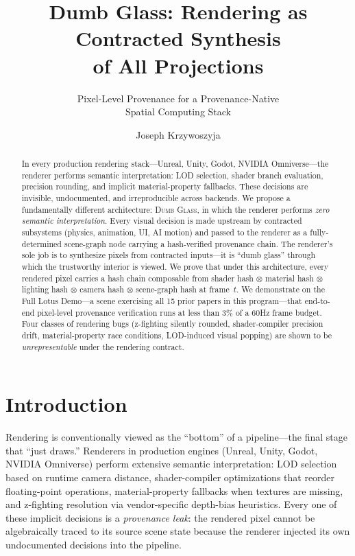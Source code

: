 \documentclass[sigconf,nonacm]{acmart}
\title{Dumb Glass: Rendering as Contracted Synthesis\\
of All Projections}
\subtitle{Pixel-Level Provenance for a Provenance-Native\\
Spatial Computing Stack}
\author{Joseph Krzywoszyja}
\affiliation{%
  \institution{Infinitus Systems}
  \country{USA}
}
\newcommand{\dumbglass}{\textsc{Dumb Glass}}
\newcommand{\tropmult}{\otimes}
\begin{document}
\begin{abstract}
In every production rendering stack---Unreal, Unity, Godot,
NVIDIA Omniverse---the renderer performs semantic interpretation:
LOD selection, shader branch evaluation, precision rounding, and
implicit material-property fallbacks. These decisions are invisible,
undocumented, and irreproducible across backends. We propose a
fundamentally different architecture: \dumbglass{}, in which the
renderer performs \emph{zero semantic interpretation}. Every visual
decision is made upstream by contracted subsystems (physics,
animation, UI, AI motion) and passed to the renderer as a
fully-determined scene-graph node carrying a hash-verified
provenance chain. The renderer's sole job is to synthesize pixels
from contracted inputs---it is ``dumb glass'' through which the
trustworthy interior is viewed. We prove that under this
architecture, every rendered pixel carries a hash chain composable
from shader hash $\tropmult$ material hash $\tropmult$ lighting
hash $\tropmult$ camera hash $\tropmult$ scene-graph hash at
frame~$t$. We demonstrate on the Full Lotus Demo---a scene
exercising all 15 prior papers in this program---that end-to-end
pixel-level provenance verification runs at less than 3\% of a
60Hz frame budget. Four classes of rendering bugs (z-fighting
silently rounded, shader-compiler precision drift, material-property
race conditions, LOD-induced visual popping) are shown to be
\emph{unrepresentable} under the rendering contract.
\end{abstract}


\maketitle

\section{Introduction}
\label{sec:intro}

Rendering is conventionally viewed as the ``bottom'' of a
pipeline---the final stage that ``just draws.'' Renderers in
production engines (Unreal, Unity, Godot, NVIDIA Omniverse)
perform extensive semantic interpretation: LOD selection based
on runtime camera distance, shader-compiler optimizations that
reorder floating-point operations, material-property fallbacks
when textures are missing, and z-fighting resolution via
vendor-specific depth-bias heuristics. Every one of these
implicit decisions is a \emph{provenance leak}: the rendered
pixel cannot be algebraically traced to its source scene state
because the renderer injected its own undocumented decisions
into the pipeline.
\end{document}
